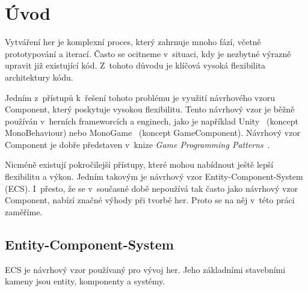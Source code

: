 \chapter{Úvod}
\label{chap:intro}
Vytváření her je komplexní proces, který zahrnuje mnoho fází, včetně prototypování a iterací. Často se ocitneme v~situaci, kdy je nezbytné výrazně upravit již existující kód. Z~tohoto důvodu je klíčová vysoká flexibilita architektury kódu.

Jedním z~přístupů k~řešení tohoto problému je využití návrhového vzoru Component, který poskytuje vysokou flexibilitu. Tento návrhový vzor je běžně používán v~herních frameworcích a enginech, jako je například Unity~\cite{Unity} (koncept MonoBehaviour) nebo MonoGame~\cite{MonoGame} (koncept GameComponent). Návrhový vzor Component je dobře představen v~knize \textit{Game Programming Patterns}~\cite{nystrom2014game}.

Nicméně existují pokročilejší přístupy, které mohou nabídnout ještě lepší flexibilitu a výkon. Jedním takovým je návrhový vzor Entity-Component-System (ECS). I~přesto, že se v~současné době nepoužívá tak často jako návrhový vzor Component, nabízí značné výhody při tvorbě her. Proto se na něj v~této práci zaměříme.

\section{Entity-Component-System}
ECS je návrhový vzor používaný pro vývoj her. Jeho základními stavebními kameny jsou entity, komponenty a systémy.

